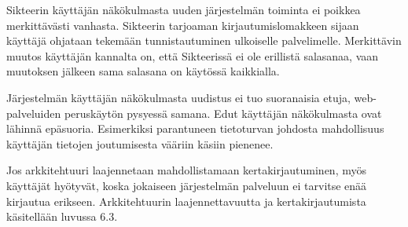 Sikteerin käyttäjän näkökulmasta uuden järjestelmän toiminta ei poikkea merkittävästi vanhasta. Sikteerin tarjoaman kirjautumislomakkeen sijaan käyttäjä ohjataan tekemään tunnistautuminen ulkoiselle palvelimelle. Merkittävin muutos käyttäjän kannalta on, että Sikteerissä ei ole erillistä salasanaa, vaan muutoksen jälkeen sama salasana on käytössä kaikkialla.

Järjestelmän käyttäjän näkökulmasta uudistus ei tuo suoranaisia etuja, web-pal\-ve\-lui\-den peruskäytön pysyessä samana. Edut käyttäjän näkökulmasta ovat lähinnä epäsuoria. Esimerkiksi parantuneen tietoturvan johdosta mahdollisuus käyttäjän tietojen joutumisesta vääriin käsiin pienenee.

Jos arkkitehtuuri laajennetaan mahdollistamaan kertakirjautuminen, myös käyttäjät hyötyvät, koska jokaiseen järjestelmän palveluun ei tarvitse enää kirjautua erikseen. Arkkitehtuurin laajennettavuutta ja kertakirjautumista käsitellään luvussa 6.3.